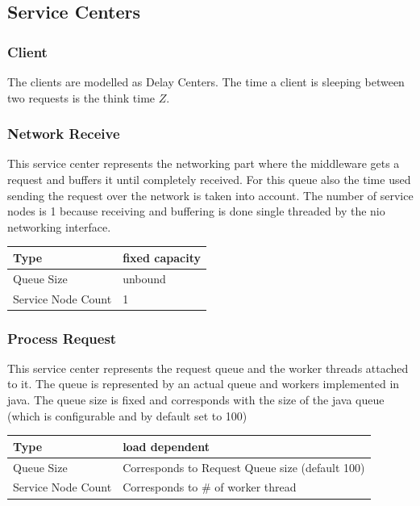 \documentclass[a4paper]{article}
\begin{document}
\subsection{Service Centers}

\subsubsection{Client}
The clients are modelled as Delay Centers. The time a client is sleeping between two requests is the think time $Z$.

\subsubsection{Network Receive}
\label{subsub:ServiceCenterNetworkReceive}

This service center represents the networking part where the middleware gets a request and buffers it until completely received. For this queue also the time used sending the request over the network is taken into account. The number of service nodes is 1 because receiving and buffering is done single threaded by the nio networking interface.\\

\begin{tabular}{|l|l|}
\hline 
Type & fixed capacity \\ 
\hline 
Queue Size & unbound\\ 
\hline 
Service Node Count & 1 \\ 
\hline 
\end{tabular} 

\subsubsection{Process Request}
This service center represents the request queue and the worker threads attached to it. The queue is represented by an actual queue and workers implemented in java. The queue size is fixed and corresponds with the size of the java queue (which is configurable and by default set to 100) \\

\begin{tabular}{|l|l|}
\hline 
Type & load dependent \\ 
\hline 
Queue Size & Corresponds to Request Queue size (default 100)\\ 
\hline 
Service Node Count & Corresponds to \# of worker thread \\ 
\hline 
\end{tabular} 
\end{document}

